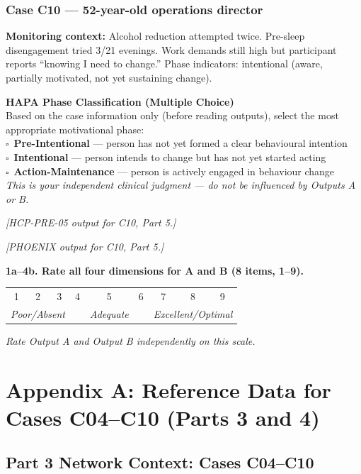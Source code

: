 \documentclass[11pt,a4paper]{article}
\makeatletter
\newcommand{\likertscale}[1]{%
\par\vspace{0.15em}%
\noindent\begin{tcolorbox}[colback=ScaleBG,colframe=BorderGrey,boxrule=0.4pt,arc=1mm,left=5pt,right=5pt,top=4pt,bottom=4pt]%
\small\textbf{\color{SlateMid}#1}\\[0.25em]%
\begin{tabular}{@{}*{9}{c}@{}}%
1 & 2 & 3 & 4 & 5 & 6 & 7 & 8 & 9 \\%
\multicolumn{3}{l}{\tiny\itshape Poor/Absent} & & \multicolumn{1}{c}{\tiny\itshape Adequate} & & \multicolumn{3}{r}{\tiny\itshape Excellent/Optimal}%
\end{tabular}%
\quad\textit{Rate Output A and Output B independently on this scale.}%
\end{tcolorbox}\vspace{0.1em}}
\newcommand{\hapascale}{%
\par\vspace{0.15em}%
\noindent\begin{tcolorbox}[colback=AccentRed,colframe=RichPurple,boxrule=0.5pt,arc=1mm,left=6pt,right=6pt,top=4pt,bottom=4pt]%
\small\textbf{\color{RichPurple}HAPA Phase Classification (Multiple Choice)}\\[0.15em]%
Based on the case information only (before reading outputs), select the most appropriate motivational phase:\\[0.1em]%
$\square$~\textbf{Pre-Intentional} --- person has not yet formed a clear behavioural intention\\%
$\square$~\textbf{Intentional} --- person intends to change but has not yet started acting\\%
$\square$~\textbf{Action-Maintenance} --- person is actively engaged in behaviour change\\[0.1em]%
\textit{This is your independent clinical judgment --- do not be influenced by Outputs A or B.}%
\end{tcolorbox}\vspace{0.1em}}
\makeatother
\begin{document}
\vspace{0.4em}

\subsubsection*{Case C10 --- 52-year-old operations director}
\begin{tcolorbox}[colback=AccentAmber,colframe=GoldAmber,boxrule=0.7pt,arc=2mm,left=8pt,right=8pt,top=7pt,bottom=7pt]
\small\textbf{Monitoring context:} Alcohol reduction attempted twice. Pre-sleep disengagement tried 3/21 evenings. Work demands still high but participant reports ``knowing I need to change.'' Phase indicators: intentional (aware, partially motivated, not yet sustaining change).
\end{tcolorbox}
\hapascale
\begin{outputAbox}\small\textit{[HCP-PRE-05 output for C10, Part 5.]}\end{outputAbox}
\begin{outputBbox}\small\textit{[PHOENIX output for C10, Part 5.]}\end{outputBbox}
\begin{ratingbox}
\likertscale{1a--4b. Rate all four dimensions for A and B (8 items, 1--9).}
\end{ratingbox}

\newpage

\appendix
\section{Appendix A: Reference Data for Cases C04--C10 (Parts 3 and 4)}

\subsection*{Part 3 Network Context: Cases C04--C10}
\end{document}
